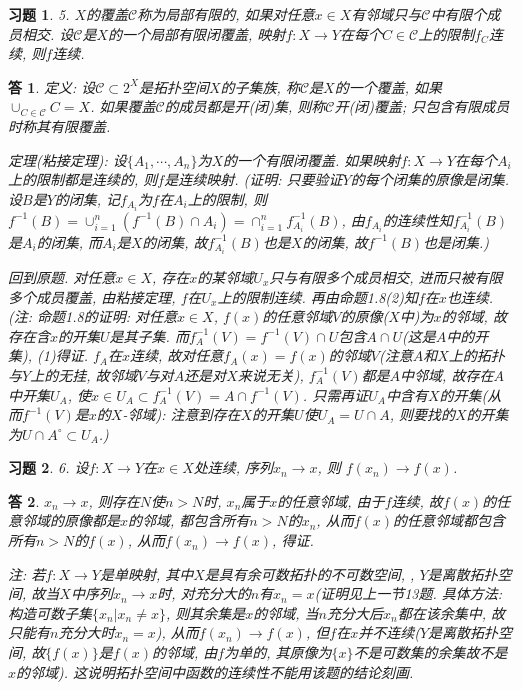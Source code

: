 \documentclass{ctexart}%
\newtheorem*{exercise}{习题}
\newtheorem*{solution}{答}
\theoremstyle{definition}
\theoremstyle{remark}
\begin{document}
\begin{exercise}5. $X$的覆盖$\mathscr{C}$称为局部有限的, 如果对任意$x\in X$有邻域只与$\mathscr{C}$中有限个成员相交. 设$\mathscr{C}$是$X$的一个局部有限闭覆盖, 映射$f: X\rightarrow Y$在每个$C\in \mathscr{C}$上的限制$f_C$连续, 则$f$连续. 
\end{exercise}
\begin{solution}
定义: 设$\mathscr{C} \subset 2^X$是拓扑空间$X$的子集族, 称$\mathscr{C}$是$X$的一个覆盖, 如果$\cup_{C\in \mathscr{C}}C=X$. 如果覆盖$\mathscr{C}$的成员都是开(闭)集, 则称$\mathscr{C}$开(闭)覆盖; 只包含有限成员时称其有限覆盖. 

定理(粘接定理): 设$\{A_1,\cdots,A_n\}$为$X$的一个有限闭覆盖. 如果映射$f: X\rightarrow Y$在每个$A_i$上的限制都是连续的, 则$f$是连续映射. (证明: 只要验证$Y$的每个闭集的原像是闭集. 设$B$是$Y$的闭集, 记$f_{A_i}$为$f$在$A_i$上的限制, 则$f^{-1}(B)=\cup_{i=1}^n(f^{-1}(B)\cap A_i)=\cap_{i=1}^nf^{-1}_{A_i}(B)$, 由$f_{A_i}$的连续性知$f^{-1}_{A_i}(B)$是$A_i$的闭集, 而$A_i$是$X$的闭集, 故$f^{-1}_{A_i}(B)$也是$X$的闭集, 故$f^{-1}(B)$也是闭集.)

回到原题. 对任意$x\in X$, 存在$x$的某邻域$U_x$只与有限多个成员相交, 进而只被有限多个成员覆盖, 由粘接定理, $f$在$U_x$上的限制连续. 再由命题1.8(2)知$f$在$x$也连续. (注: 命题1.8的证明: 对任意$x\in X$, $f(x)$的任意邻域$V$的原像($X$中)为$x$的邻域, 故存在含$x$的开集$U$是其子集. 而$f^{-1}_A(V)=f^{-1}(V)\cap U$包含$A\cap U$(这是$A$中的开集), (1)得证. $f_A$在$x$连续, 故对任意$f_A(x)=f(x)$的邻域$V$(注意$A$和$X$上的拓扑与$Y$上的无挂, 故邻域$V$与对$A$还是对$X$来说无关), $f^{-1}_A(V)$都是$A$中邻域, 故存在$A$中开集$U_A$, 使$x\in U_A\subset f^{-1}_A(V)=A\cap f^{-1}(V)$. 只需再证$U_A$中含有$X$的开集(从而$f^{-1}(V)$是$x$的$X$-邻域): 注意到存在$X$的开集$U$使$U_A=U\cap A$, 则要找的$X$的开集为$U\cap A^\circ\subset U_A$.)
\end{solution}

\begin{exercise}6. 设$f: X\rightarrow Y$在$x\in X$处连续, 序列$x_n\rightarrow x$, 则 $f(x_n)\rightarrow
f(x)$.
\end{exercise}
\begin{solution}$x_n\rightarrow x$, 则存在$N$使$n>N$时, $x_n$属于$x$的任意邻域, 由于$f$连续, 故$f(x)$的任意邻域的原像都是$x$的邻域, 都包含所有$n>N$的$x_n$, 从而$f(x)$的任意邻域都包含所有$n>N$的$f(x)$, 从而$f(x_n)\rightarrow f(x)$, 得证. 

注: 若$f:X\rightarrow Y$是单映射, 其中$X$是具有余可数拓扑的不可数空间, , $Y$是离散拓扑空间, 故当$X$中序列$x_n\rightarrow x$时, 对充分大的$n$有$x_n=x$(证明见上一节13题. 具体方法: 构造可数子集$\{x_n|x_n\neq x\}$, 则其余集是$x$的邻域, 当$n$充分大后$x_n$都在该余集中, 故只能有$n$充分大时$x_n=x$), 从而$f(x_n)\rightarrow f(x)$, 但$f$在$x$并不连续($Y$是离散拓扑空间, 故$\{f(x)\}$是$f(x)$的邻域, 由$f$为单的, 其原像为$\{x\}$不是可数集的余集故不是$x$的邻域). 这说明拓扑空间中函数的连续性不能用该题的结论刻画. 
\end{solution}
\end{document}
